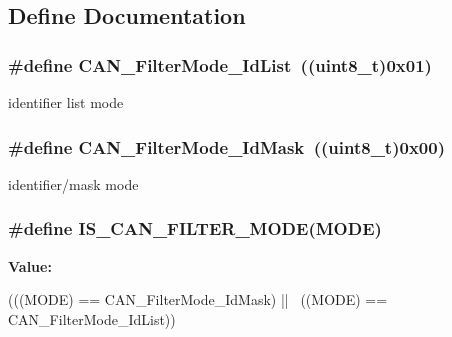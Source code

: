 \subsection{Define Documentation}
\hypertarget{group__CAN__filter__mode_ga91e9144f71b15ac345ee89314711c158}{
\subsubsection[{CAN\_\-FilterMode\_\-IdList}]{\setlength{\rightskip}{0pt plus 5cm}\#define CAN\_\-FilterMode\_\-IdList~((uint8\_\-t)0x01)}}
\label{group__CAN__filter__mode_ga91e9144f71b15ac345ee89314711c158}
identifier list mode \hypertarget{group__CAN__filter__mode_ga8136e518fb31fd91079e4c7c4c19c94b}{
\subsubsection[{CAN\_\-FilterMode\_\-IdMask}]{\setlength{\rightskip}{0pt plus 5cm}\#define CAN\_\-FilterMode\_\-IdMask~((uint8\_\-t)0x00)}}
\label{group__CAN__filter__mode_ga8136e518fb31fd91079e4c7c4c19c94b}
identifier/mask mode \hypertarget{group__CAN__filter__mode_gae684565d5392c12fd333379e5ec840f8}{
\subsubsection[{IS\_\-CAN\_\-FILTER\_\-MODE}]{\setlength{\rightskip}{0pt plus 5cm}\#define IS\_\-CAN\_\-FILTER\_\-MODE(MODE)}}
\label{group__CAN__filter__mode_gae684565d5392c12fd333379e5ec840f8}
{\bfseries Value:}
\begin{DoxyCode}
(((MODE) == CAN_FilterMode_IdMask) || \
                                  ((MODE) == CAN_FilterMode_IdList))
\end{DoxyCode}

